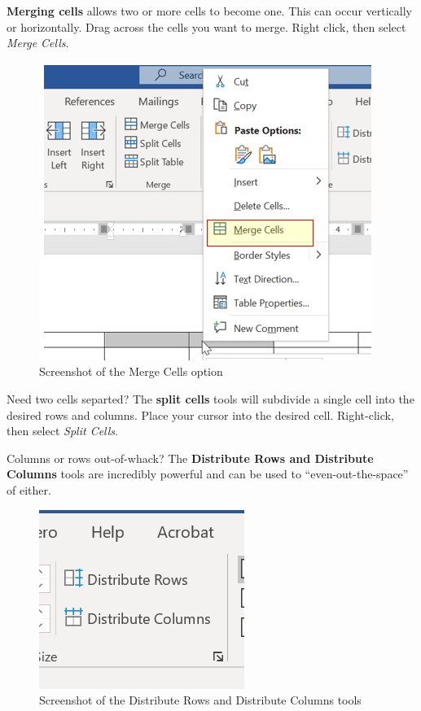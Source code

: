 \documentclass[
  english,
]{book}
\begin{document}
\textbf{Merging cells} allows two or more cells to become one. This can occur vertically or horizontally. Drag across the cells you want to merge. Right click, then select \emph{Merge Cells}.

\begin{figure}
\centering
\includegraphics{images/TableMagic/MergeCells.png}
\caption{Screenshot of the Merge Cells option}
\end{figure}

Need two cells separted? The \textbf{split cells} tools will subdivide a single cell into the desired rows and columns. Place your cursor into the desired cell. Right-click, then select \emph{Split Cells}.

Columns or rows out-of-whack? The \textbf{Distribute Rows and Distribute Columns} tools are incredibly powerful and can be used to ``even-out-the-space'' of either.

\begin{figure}
\centering
\includegraphics{images/TableMagic/Distribute.png}
\caption{Screenshot of the Distribute Rows and Distribute Columns tools}
\end{figure}
\end{document}
